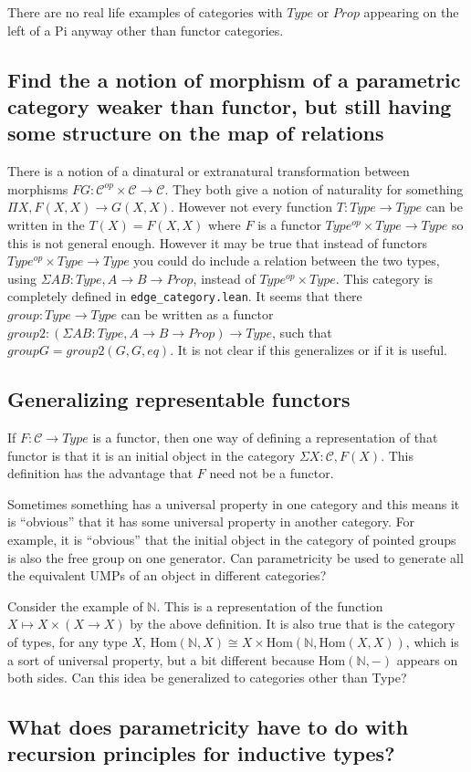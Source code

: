 \documentclass[12pt]{article} %
\theoremstyle{definition}
\theoremstyle{definition}
\theoremstyle{definition}
\theoremstyle{definition}
\begin{document}
There are no real life examples of categories with $Type$ or $Prop$ appearing on the left of a 
Pi anyway other than functor categories.

\subsection{Find the a notion of morphism of a parametric category weaker than functor, but
  still having some structure on the map of relations}

There is a notion of a dinatural or extranatural transformation between morphisms 
$F G : \mathcal{C}^{op} \times \mathcal{C} \rightarrow \mathcal{C}$. They both give 
a notion of naturality for something $\Pi X, F(X, X) \rightarrow G(X,X)$. However not
every function $T : Type \rightarrow Type$ can be written in the $T(X) = F(X, X)$ where 
$F$ is a functor $Type^{op} \times Type \rightarrow Type$ so this is not general enough. 
However it may be true that instead of functors $Type^{op} \times Type \rightarrow Type$
you could do include a relation between the two types, using $\Sigma A B : Type, A \rightarrow B \rightarrow Prop$,
instead of $Type^{op} \times Type$. This category is completely defined in \lstinline{edge_category.lean}.
It seems that there $group : Type \rightarrow Type$ can be written as a functor
$group2 : (\Sigma A B : Type, A \rightarrow B \rightarrow Prop) \rightarrow Type$, such that 
$group G = group2(G, G, eq)$. It is not clear if this generalizes or if it is useful.

\subsection{Generalizing representable functors}
If $F : \mathcal{C} \rightarrow Type$ is a functor, then one way of defining a representation
of that functor is that it is an initial object in the category $\Sigma X : \mathcal{C}, F(X)$.
This definition has the advantage that $F$ need not be a functor.

Sometimes something has a universal property in one category and this means it is ``obvious'' that 
it has some universal property in another category. For example, it is ``obvious'' that the initial
object in the category of pointed groups is also the free group on one generator. Can parametricity be used 
to generate all the equivalent UMPs of an object in different categories?

Consider the example of $\mathbb{N}$. This is a representation of the function 
$X \mapsto X \times (X \rightarrow X)$ 
by the above definition. It is also true that is the category of types, for any type $X$, $\text{Hom}(
\mathbb{N}, X) \cong X \times \text{Hom}(\mathbb{N}, \text{Hom}(X, X))$, which is a sort of universal property,
but a bit different because $\text{Hom}(\mathbb{N}, -)$ appears on both sides. Can this idea be generalized
to categories other than Type?

\subsection{What does parametricity have to do with recursion principles for inductive types?}


\end{document}
